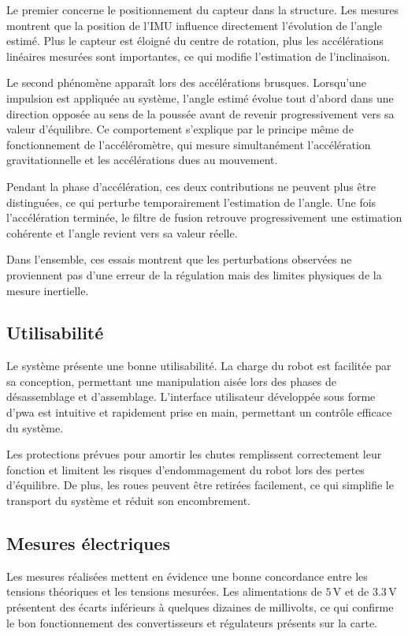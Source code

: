 Le premier concerne le positionnement du capteur dans la structure. Les mesures montrent que la position de l'IMU influence directement l'évolution de l'angle estimé. Plus le capteur est éloigné du centre de rotation, plus les accélérations linéaires mesurées sont importantes, ce qui modifie l'estimation de l'inclinaison.

Le second phénomène apparaît lors des accélérations brusques. Lorsqu'une impulsion est appliquée au système, l'angle estimé évolue tout d'abord dans une direction opposée au sens de la poussée avant de revenir progressivement vers sa valeur d'équilibre. Ce comportement s'explique par le principe même de fonctionnement de l'accéléromètre, qui mesure simultanément l'accélération gravitationnelle et les accélérations dues au mouvement.

Pendant la phase d'accélération, ces deux contributions ne peuvent plus être distinguées, ce qui perturbe temporairement l'estimation de l'angle. Une fois l'accélération terminée, le filtre de fusion retrouve progressivement une estimation cohérente et l'angle revient vers sa valeur réelle.

Dans l'ensemble, ces essais montrent que les perturbations observées ne proviennent pas d'une erreur de la régulation mais des limites physiques de la mesure inertielle.

\subsection{Utilisabilité}

Le système présente une bonne utilisabilité. La charge du robot est facilitée par sa conception, permettant une manipulation aisée lors des phases de désassemblage et d'assemblage. L'interface utilisateur développée sous forme d'\acrshort{pwa} est intuitive et rapidement prise en main, permettant un contrôle efficace du système.

Les protections prévues pour amortir les chutes remplissent correctement leur fonction et limitent les risques d'endommagement du robot lors des pertes d'équilibre. De plus, les roues peuvent être retirées facilement, ce qui simplifie le transport du système et réduit son encombrement.
\subsection{Mesures électriques}

Les mesures réalisées mettent en évidence une bonne concordance entre les tensions théoriques et les tensions mesurées. Les alimentations de $5\,\si{\volt}$ et de $3.3\,\si{\volt}$ présentent des écarts inférieurs à quelques dizaines de millivolts, ce qui confirme le bon fonctionnement des convertisseurs et régulateurs présents sur la carte.

